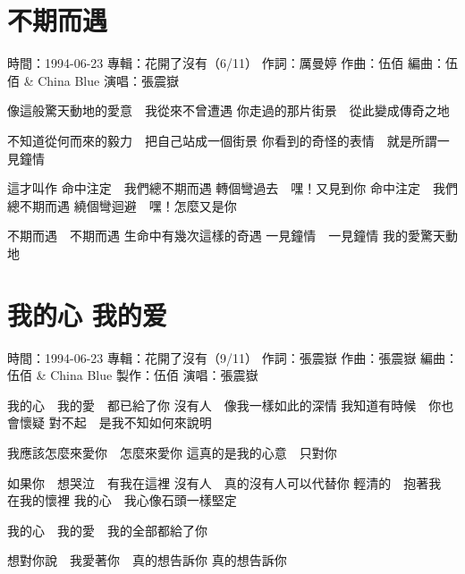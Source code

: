 \documentclass[UTF8,a4paper,oneside,twocolumn,12pt]{ctexbook}
\newcommand{\infopair}[2]{\textbullet #1：#2}
\newcommand{\zc}[1][伍佰]{\infopair{作詞}{#1}}
\newcommand{\zq}[1][伍佰]{\infopair{作曲}{#1}}
\newcommand{\bq}[1][伍佰]{\infopair{編曲}{#1}}
\newcommand{\zj}[1]{\infopair{專輯}{#1}}
\newcommand{\zz}[1]{\infopair{製作}{#1}}
\newcommand{\sj}[1]{\infopair{時間}{#1}}
\newenvironment{info}{\begin{flushleft}\kaishu
	}
	{\end{flushleft}\normalsize\yahei\par}
\newenvironment{lyric}{
	}
{}
\begin{document}
\section{不期而遇}
\begin{info}
	\sj{1994-06-23}
	\zj{花開了沒有（6/11）}
	\zc[厲曼婷]
	\zq
	\bq[伍佰 \& China Blue]
	\infopair{演唱}{張震嶽}
\end{info}
\begin{lyric}
	像這般驚天動地的愛意　我從來不曾遭遇
	你走過的那片街景　從此變成傳奇之地

	不知道從何而來的毅力　把自己站成一個街景
	你看到的奇怪的表情　就是所謂一見鐘情

	這才叫作
	命中注定　我們總不期而遇
	轉個彎過去　嘿！又見到你
	命中注定　我們總不期而遇
	繞個彎迴避　嘿！怎麼又是你

	不期而遇　不期而遇
	生命中有幾次這樣的奇遇
	一見鐘情　一見鐘情
	我的愛驚天動地
\end{lyric}

\section{我的心 我的爱}
\begin{info}
	\sj{1994-06-23}
	\zj{花開了沒有（9/11）}
	\zc[張震嶽]
	\zq[張震嶽]
	\bq[伍佰 \& China Blue]
	\zz{伍佰}
	\infopair{演唱}{張震嶽}
\end{info}
\begin{lyric}
	我的心　我的愛　都已給了你
	沒有人　像我一樣如此的深情
	我知道有時候　你也會懷疑
	對不起　是我不知如何來說明

	我應該怎麼來愛你　怎麼來愛你
	這真的是我的心意　只對你

	如果你　想哭泣　有我在這裡
	沒有人　真的沒有人可以代替你
	輕清的　抱著我　在我的懷裡
	我的心　我心像石頭一樣堅定

	我的心　我的愛　我的全部都給了你

	想對你說　我愛著你　真的想告訴你
	真的想告訴你
\end{lyric}
\end{document}
